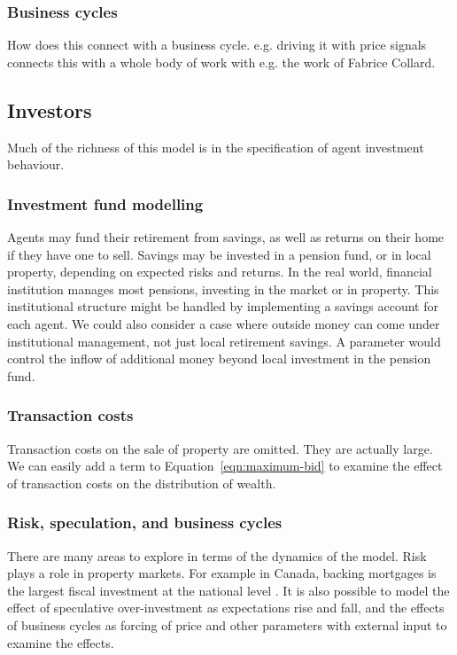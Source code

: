 \subsubsection{Business cycles}
How does this connect with a business cycle. e.g. driving it with price signals connects this with a whole body of work with e.g. the work of Fabrice Collard. 

\subsection{Investors}

Much of the richness of this model is in the specification of agent investment behaviour. 
 

\subsubsection{Investment fund modelling}
Agents may fund their retirement from savings, as well as returns on their home if they have one to sell. Savings may be invested in a pension fund, or in local property,  depending on expected risks and returns. In the real world, financial institution manages most pensions, investing in the market or in property.  This institutional structure might be handled by implementing a savings account for each agent. %
We could also consider a case where outside money can come under institutional management, not just local retirement savings. A parameter would control the inflow of additional money beyond local investment in the pension fund. 

\subsubsection{Transaction costs}
Transaction costs on the sale of property are omitted. They are actually large. We can easily add a term to  Equation~\ref{eqn:maximum-bid} to examine the effect of transaction costs on the distribution of wealth.


\subsubsection{Risk, speculation, and business cycles}

There are many areas to explore in terms of the dynamics of the model. Risk plays a role in property markets. For example in Canada, backing mortgages is the largest fiscal 
investment at the national level \cite{nemtinFinancializationHousingSocial2021}. It is also possible to model the effect of speculative over-investment as expectations rise and fall, and the effects of business cycles as forcing of price and other parameters with external input to examine the effects.


